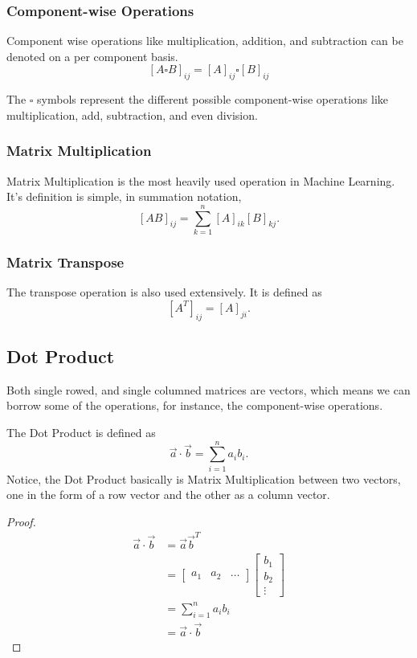 \subsubsection{Component-wise Operations}

Component wise operations like multiplication, addition, and subtraction can be denoted on a per component basis. $$[A\square B]_{ij}=[A]_{ij} \square [B]_{ij}$$

The $\square$ symbols represent the different possible component-wise operations like multiplication, add, subtraction, and even division.

\subsubsection{Matrix Multiplication}

Matrix Multiplication is the most heavily used operation in Machine Learning. It's definition is simple, in summation notation, $$[AB]_{ij}=\sum_{k=1}^n [A]_{ik}[B]_{kj}.$$

\subsubsection{Matrix Transpose}

The transpose operation is also used extensively. It is defined as $$[A^T]_{ij}=[A]_{ji}.$$

\subsection{Dot Product}

Both single rowed, and single columned matrices are vectors, which means we can borrow some of the operations, for instance, the component-wise operations.

The Dot Product is defined as $$\vec{a}\cdot \vec{b}=\sum_{i=1}^n a_i b_i.$$ Notice, the Dot Product basically is Matrix Multiplication between two vectors, one in the form of a row vector and the other as a column vector. 

\begin{proof}
\begin{align*}
\vec{a}\cdot \vec{b}&=\vec{a}\vec{b}^T\\
&=\begin{bmatrix}a_1 & a_2 & \dots \end{bmatrix}
\begin{bmatrix}b_1 \\ b_2 \\ \vdots \end{bmatrix}\\
&=\sum_{i=1}^na_i b_i \\
&=\vec{a}\cdot \vec{b}
\end{align*}
\end{proof}

